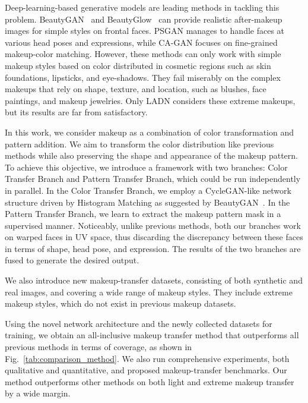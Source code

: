 \documentclass[final]{cvpr}
\newcommand{\Fref}[1]{Fig.~\ref{#1}}
\begin{document}
Deep-learning-based generative models are leading methods in tackling this problem. BeautyGAN~\cite{beautygan} and BeautyGlow~\cite{beautyglow} can provide realistic after-makeup images for simple styles on frontal faces. PSGAN \cite{jiang2019psgan} manages to handle faces at various head poses and expressions, while CA-GAN \cite{kips2020cagan} focuses on fine-grained makeup-color matching. However, these methods can only work with simple makeup styles based on color distributed in cosmetic regions such as skin foundations, lipsticks, and eye-shadows. They fail miserably on the complex makeups that rely on shape, texture, and location, such as blushes, face paintings, and makeup jewelries. Only LADN \cite{gu2019ladn} considers these extreme makeups, but its results are far from satisfactory.

In this work, we consider makeup as a combination of color transformation and pattern addition. We aim to transform the color distribution like previous methods while also preserving the shape and appearance of the makeup pattern. To achieve this objective, we introduce a framework with two branches: Color Transfer Branch and Pattern Transfer Branch, which could be run independently in parallel. In the Color Transfer Branch, we employ a CycleGAN-like network structure driven by Histogram Matching as suggested by BeautyGAN~\cite{beautygan}. In the Pattern Transfer Branch, we learn to extract the makeup pattern mask in a supervised manner. Noticeably, unlike previous methods, both our branches work on warped faces in UV space, thus discarding the discrepancy between these faces in terms of shape, head pose, and expression. The results of the two branches are fused to generate the desired output.



We also introduce new makeup-transfer datasets, consisting of both synthetic and real images, and covering a wide range of makeup styles. They include extreme makeup styles, which do not exist in previous makeup datasets. 



Using the novel network architecture and the newly collected datasets for training, we obtain an all-inclusive makeup transfer method that outperforms all previous methods in terms of coverage, as shown in \Fref{tab:comparison_method}. We also run comprehensive experiments, both qualitative and quantitative, and proposed makeup-transfer benchmarks. Our method outperforms other methods on both light and extreme makeup transfer by a wide margin.
\end{document}

